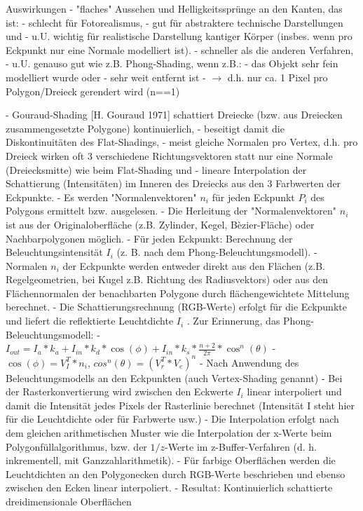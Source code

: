 \documentclass[10pt,landscape]{article}
\begin{document}
\begin{multicols}{3}
  Auswirkungen
  - "flaches" Aussehen und Helligkeitssprünge an den Kanten, das ist:
  - schlecht für Fotorealismus,
  - gut für abstraktere technische Darstellungen und
  - u.U. wichtig für realistische Darstellung kantiger Körper (insbes. wenn pro Eckpunkt nur eine Normale modelliert ist).
  - schneller als die anderen Verfahren,
  - u.U. genauso gut wie z.B. Phong-Shading, wenn z.B.:
  - das Objekt sehr fein modelliert wurde oder
  - sehr weit entfernt ist
  - $\rightarrow$ d.h. nur ca. 1 Pixel pro Polygon/Dreieck gerendert wird (n==1)
  
  - Gouraud-Shading [H. Gouraud 1971] schattiert Dreiecke (bzw. aus Dreiecken zusammengesetzte Polygone) kontinuierlich,
  - beseitigt damit die Diskontinuitäten des Flat-Shadings,
  - meist gleiche Normalen pro Vertex, d.h. pro Dreieck wirken oft 3 verschiedene Richtungsvektoren statt nur eine Normale (Dreiecksmitte) wie beim Flat-Shading und
  - lineare Interpolation der Schattierung (Intensitäten) im Inneren des Dreiecks aus den 3 Farbwerten der Eckpunkte.
  - Es werden "Normalenvektoren" $n_i$ für jeden Eckpunkt $P_i$ des Polygons ermittelt bzw. ausgelesen.
  - Die Herleitung der "Normalenvektoren" $n_i$ ist aus der Originaloberfläche (z.B. Zylinder, Kegel, Bèzier-Fläche) oder Nachbarpolygonen möglich.
  - Für jeden Eckpunkt: Berechnung der Beleuchtungsintensität $I_i$ (z. B. nach dem Phong-Beleuchtungsmodell).
  - Normalen $n_i$ der Eckpunkte werden entweder direkt aus den Flächen (z.B. Regelgeometrien, bei Kugel z.B. Richtung des Radiusvektors) oder aus den Flächennormalen der benachbarten Polygone durch flächengewichtete Mittelung berechnet.
  - Die Schattierungsrechnung (RGB-Werte) erfolgt für die Eckpunkte und liefert die reflektierte Leuchtdichte $I_i$ . Zur Erinnerung, das Phong-Beleuchtungsmodell:
  - $I_{out}=I_a*k_a+I_{in}*k_d*\cos(\phi)+I_{in}*k_s*\frac{n+2}{2\pi}*\cos^n(\theta)$
  - $\cos(\phi)=V^T_I*n_i$, $cos^n(\theta)=(V^T_r * V_e)^n$
  - Nach Anwendung des Beleuchtungsmodells an den Eckpunkten (auch Vertex-Shading genannt)
  - Bei der Rasterkonvertierung wird zwischen den Eckwerte $I_i$ linear interpoliert und damit die Intensität jedes Pixels der Rasterlinie berechnet (Intensität I steht hier für die Leuchtdichte oder für Farbwerte usw.)
  - Die Interpolation erfolgt nach dem gleichen arithmetischen Muster wie die Interpolation der x-Werte beim Polygonfüllalgorithmus, bzw. der $1/z$-Werte im z-Buffer-Verfahren (d. h. inkrementell, mit Ganzzahlarithmetik).
  - Für farbige Oberflächen werden die Leuchtdichten an den Polygonecken durch RGB-Werte beschrieben und ebenso zwischen den Ecken linear interpoliert.
  - Resultat: Kontinuierlich schattierte dreidimensionale Oberflächen
  

\end{multicols}
\end{document}
